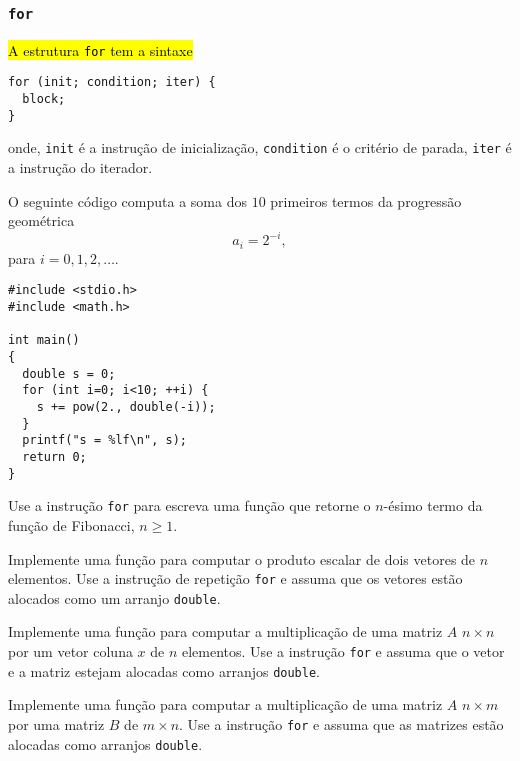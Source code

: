 \documentclass[12pt]{article}
\begin{document}
\subsubsection{\texttt{for}}

\hl{A estrutura {\lstinline+for+} tem a sintaxe}
\begin{lstlisting}
for (init; condition; iter) {
  block;
}
\end{lstlisting}
onde, \lstinline!init! é a instrução de inicialização, \lstinline+condition+ é o critério de parada, \lstinline+iter+ é a instrução do iterador.

\begin{ex}
  O seguinte código computa a soma dos $10$ primeiros termos da progressão geométrica
  \begin{equation}
    a_i = 2^{-i},
  \end{equation}
  para $i = 0, 1, 2, \ldots$.
\begin{lstlisting}
#include <stdio.h>
#include <math.h>

int main()
{
  double s = 0;
  for (int i=0; i<10; ++i) {
    s += pow(2., double(-i));
  }
  printf("s = %lf\n", s);
  return 0;
}
\end{lstlisting}
\end{ex}

\begin{exr}
  Use a instrução \lstinline!for! para escreva uma função que retorne o $n$-ésimo termo da função de Fibonacci{\fibonacci}, $n\geq 1$.
\end{exr}

\begin{exr}
  Implemente uma função para computar o produto escalar de dois vetores de $n$ elementos. Use a instrução de repetição \lstinline!for! e assuma que os vetores estão alocados como um arranjo \lstinline!double!.
\end{exr}

\begin{exr}
  Implemente uma função para computar a multiplicação de uma matriz $A$ $n\times n$ por um vetor coluna $x$ de $n$ elementos. Use a instrução \lstinline!for! e assuma que o vetor e a matriz estejam alocadas como arranjos \lstinline!double!.
\end{exr}

\begin{exr}
  Implemente uma função para computar a multiplicação de uma matriz $A$ $n\times m$ por uma matriz $B$ de $m\times n$. Use a instrução \lstinline!for! e assuma que as matrizes estão alocadas como arranjos \lstinline+double+.
\end{exr}
\end{document}
